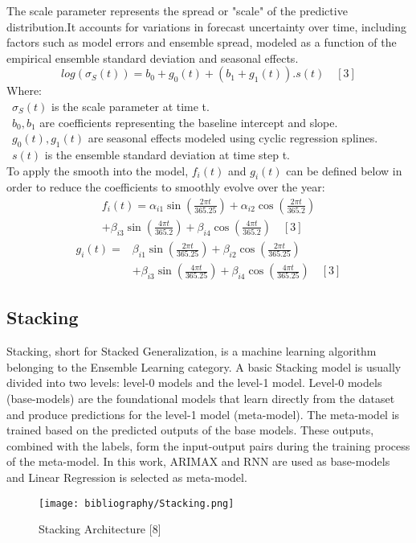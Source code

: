 \documentclass{ieeeojies}
\begin{document}
The scale parameter represents the spread or "scale" of the predictive distribution.It accounts for variations in forecast uncertainty over time, including factors such as model errors and ensemble spread, modeled as a function of the empirical ensemble standard deviation and seasonal effects.
\[log(\sigma_S(t)) = b_0 + g_0(t) + (b_1 + g_1(t)).s(t) \quad[3]\]
Where: \\
        \indent\textbullet\ \(\sigma_S(t)\) is the scale parameter at time t. \\
        \indent\textbullet\ \(b_0, b_1\) are coefficients representing the baseline intercept and slope. \\
        \indent\textbullet\ \(g_0(t), g_1(t)\) are seasonal effects modeled using cyclic regression splines. \\
        \indent\textbullet\ \(s(t)\) is the ensemble standard deviation at time step t. \\

To apply the smooth into the model, \(f_i(t)\) and \(g_i(t)\) can be defined below in order to reduce the coefficients to smoothly evolve over the year:
\begin{multline*}
f_i(t) = \alpha_{i1} \sin\left(\frac{2\pi t}{365.25}\right) + \alpha_{i2} \cos\left(\frac{2\pi t}{365.2}\right) \\
+ \beta_{i3} \sin\left(\frac{4\pi t}{365.2}\right) + \beta_{i4} \cos\left(\frac{4\pi t}{365.2}\right) \quad [3]
\end{multline*}
\begin{align*}
g_i(t) = &\beta_{i1} \sin\left(\frac{2\pi t}{365.25}\right) + \beta_{i2} \cos\left(\frac{2\pi t}{365.25}\right) \\
&+ \beta_{i3} \sin\left(\frac{4\pi t}{365.25}\right) + \beta_{i4} \cos\left(\frac{4\pi t}{365.25}\right) \quad [3]
\end{align*}
\subsection{Stacking}

Stacking, short for Stacked Generalization, is a machine learning algorithm belonging to the Ensemble Learning category. A basic Stacking model is usually divided into two levels: level-0 models and the level-1 model. Level-0 models (base-models) are the foundational models that learn directly from the dataset and produce predictions for the level-1 model (meta-model). The meta-model is trained based on the predicted outputs of the base models. These outputs, combined with the labels, form the input-output pairs during the training process of the meta-model. In this work, ARIMAX and RNN are used as base-models and Linear Regression is selected as meta-model.  
\begin{figure}[H]
  \centering
  \begin{minipage}{1\linewidth}
    \centering
    \texttt{[image: bibliography/Stacking.png]}
    \caption{Stacking Architecture [8]}
    \label{fig8}
  \end{minipage}
\end{figure}
\end{document}
